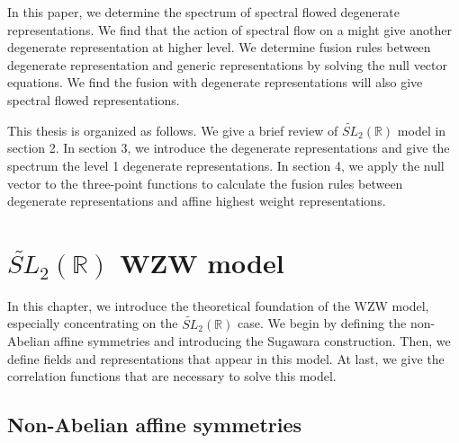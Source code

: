 \documentclass[10pt,a4paper]{article}
\numberwithin{equation}{section}
\begin{document}
In this paper, we determine the spectrum of spectral flowed degenerate representations. We find that the action of spectral flow on a 
might give another degenerate representation at higher level. We determine fusion rules between degenerate representation and generic 
representations by solving the null vector equations. We find the fusion with degenerate representations will also 
give spectral flowed representations. 

This thesis is organized as follows. We give a brief review of $\widetilde{SL}_{2}(\mathbb{R})$ model in section 2. In section 3, we 
introduce the degenerate representations and give the spectrum the level 1 degenerate representations. In section 4, we apply the null 
vector to the three-point functions to calculate the fusion rules between degenerate representations and affine highest weight representations.

\section{\texorpdfstring{$\widetilde{SL}_{2}(\mathbb{R})$}{Lg} WZW model}
In this chapter, we introduce the theoretical foundation of the WZW model, especially concentrating on the 
$\widetilde{SL}_{2}(\mathbb{R})$ case. We begin by defining the non-Abelian affine symmetries and introducing the Sugawara construction. 
Then, we define fields and representations that appear in this model. 
At last, we give the correlation functions that are necessary to solve this model. 

\subsection{Non-Abelian affine symmetries}
\end{document}
